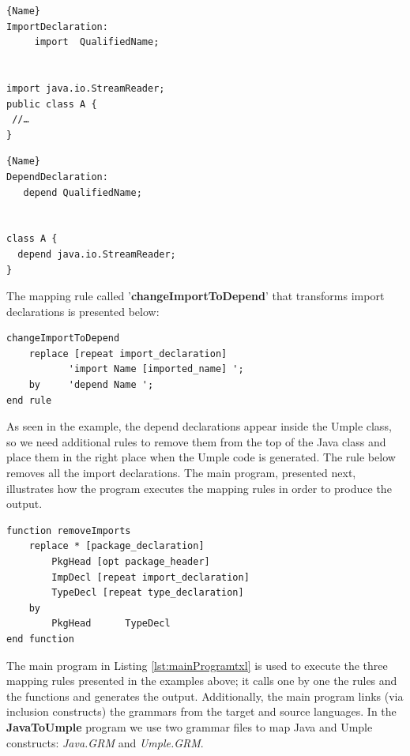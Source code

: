\noindent\begin{minipage}{.45\textwidth}
\begin{lstlisting}[style=umplePlain,caption=Java Import]{Name}
ImportDeclaration:
     import  QualifiedName; 


import java.io.StreamReader;
public class A {
 //…
}
\end{lstlisting}
\end{minipage}\hfill
\begin{minipage}{.45\textwidth}
\begin{lstlisting}[style=umplePlain,caption=Umple Depend]{Name}
DependDeclaration:
   depend QualifiedName;


class A {
  depend java.io.StreamReader;
}
\end{lstlisting}
\end{minipage}

The mapping rule called '\textbf{changeImportToDepend}' that transforms import declarations is presented below: 

\begin{lstlisting}[style=umplePlain, label=lst:packageDeclRule, caption=TXL mapping rule for the transformation of the import declaration] 
changeImportToDepend  	
    replace [repeat import_declaration]      
           'import Name [imported_name] '; 
    by 	   'depend Name '; 
end rule
\end{lstlisting}

As seen in the example, the depend declarations appear inside the Umple class, so we need additional rules to remove them from the top of the Java class and place them in the right place when the Umple code is generated. The rule below removes all the import declarations. The main program, presented next, illustrates how the program executes the mapping rules in order to produce the output.

\begin{lstlisting}[style=umplePlain, label=lst:packageDeclRule, caption=Helper Function used to remove the imports declarations] 
function removeImports  
    replace * [package_declaration]
        PkgHead [opt package_header]   
        ImpDecl [repeat import_declaration]  
        TypeDecl [repeat type_declaration] 
    by   
        PkgHead      TypeDecl
end function
\end{lstlisting}

The main program in Listing \ref{lst:mainProgramtxl} is used to execute the three mapping rules presented in the examples above; it calls one by one the rules and the functions and generates the output. Additionally, the main program links (via inclusion constructs) the grammars from the target and source languages. In the \textbf{JavaToUmple} program we use two grammar files to map Java and Umple constructs: \textit{Java.GRM} and\textit{ Umple.GRM}.

